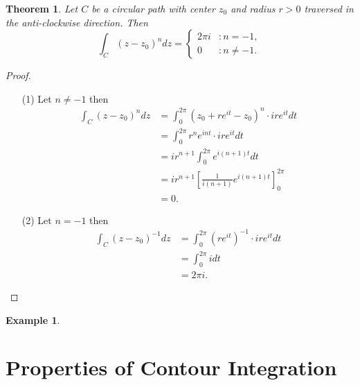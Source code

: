 \documentclass[12pt,openany]{book}
\newtheorem{theorem}{Theorem}[chapter]
\theoremstyle{definition}
\newtheorem{example}{Example}[section]
\newcommand{\of}[1]{\left( #1 \right)}
\begin{document}
	\newpage
	\begin{tcolorbox}[colframe=thmcolor, title={\color{white}\bf An Important Integral}]
		\begin{theorem}
			Let $C$ be a circular path with center $z_0$ and radius $r>0$ traversed in the anti-clockwise direction. Then \[
			\int_C\of{z-z_0}^ndz=\begin{cases}
				2\pi i &:n= -1,\\
				0 &:n\neq -1.
			\end{cases}
			\]
		\end{theorem}
	\end{tcolorbox}
	\begin{proof}
		\begin{itemize}
			\item[(1)] Let $n\neq -1$ then
			\begin{align*}
				\int_C\of{z-z_0}^ndz&=\int_0^{2\pi}\of{z_0+re^{it}-z_0}^n\cdot ire^{it}dt\\
				&=\int_0^{2\pi}r^ne^{i nt}\cdot ire^{it}dt\\
				&=ir^{n+1}\int_0^{2\pi}e^{i(n+1)t}dt\\
				&=ir^{n+1}\left[\frac{1}{i(n+1)}e^{i(n+1)t}\right]_0^{2\pi}\\
				&=0.
			\end{align*}
			\item[(2)] Let $n = -1$ then
			\begin{align*}
				\int_C\of{z-z_0}^{-1}dz&=\int_0^{2\pi}\of{re^{it}}^{-1}\cdot ire^{it}dt\\
				&=\int_0^{2\pi}i dt\\
				&=2\pi i.
			\end{align*}
		\end{itemize}
	\end{proof}
	
	\begin{example}
		
	\end{example}
	
	\newpage
	\section{Properties of Contour Integration}
	
\end{document}
